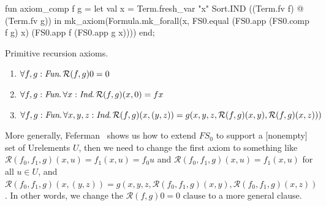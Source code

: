 fun axiom_comp f g =
  let val x = Term.fresh_var "x" Sort.IND ((Term.fv f) @ (Term.fv g))
  in mk_axiom(Formula.mk_forall(x, FS0.equal (FS0.app (FS0.comp f g) x)
                                             (FS0.app f (FS0.app g x))))
  end;
\eatline
{}\nwendcode{}\nwdocspar
\begin{node}
Primitive recursion axioms.
\begin{enumerate}
  \item $\forall f,g:\textit{Fun}\ldotp \mathcal{R}(f,g)0=0$
  \item $\forall f,g:\textit{Fun}\ldotp \forall x:\textit{Ind}\ldotp \mathcal{R}(f,g)(x,0)=fx$
  \item $\forall f,g:\textit{Fun}\ldotp\forall x,y,z:\textit{Ind}\ldotp \mathcal{R}(f,g)(x,(y,z))=g(x,y,z,\mathcal{R}(f,g)(x,y),\mathcal{R}(f,g)(x,z)))$
\end{enumerate}
More generally, Feferman~\cite[\S5.2]{feferman1982inductively} shows
us how to extend $FS_{0}$ to support a [nonempty] set of
Urelements $U$, then we need to change the first axiom to something
like $\mathcal{R}(f_{0},f_{1},g)(x,u)=f_{1}(x,u)=f_{0}u$ and
$\mathcal{R}(f_{0},f_{1},g)(x,u)=f_{1}(x,u)$ for all $u\in U$, and
$\mathcal{R}(f_{0},f_{1},g)(x,(y,z))=g(x,y,z,\mathcal{R}(f_{0},f_{1},g)(x,y),\mathcal{R}(f_{0},f_{1},g)(x,z))$. In
other words, we change the $\mathcal{R}(f,g)0=0$ clause to a more
general clause.
\end{node}

